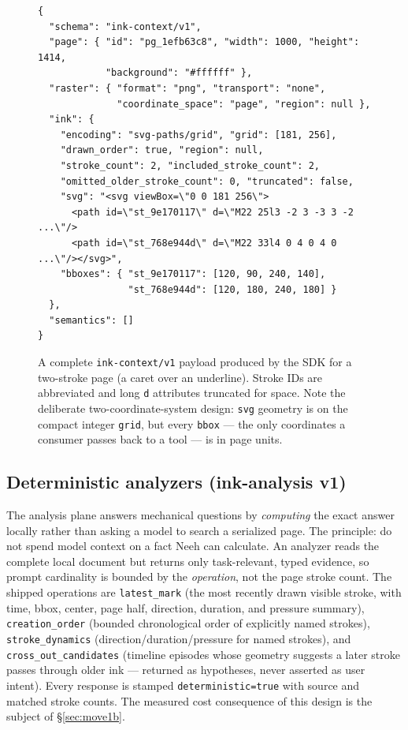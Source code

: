 \documentclass[11pt]{article}
\newcommand{\code}[1]{\texttt{#1}}
\begin{document}
\begin{figure}[t]
\begin{lstlisting}
{
  "schema": "ink-context/v1",
  "page": { "id": "pg_1efb63c8", "width": 1000, "height": 1414,
            "background": "#ffffff" },
  "raster": { "format": "png", "transport": "none",
              "coordinate_space": "page", "region": null },
  "ink": {
    "encoding": "svg-paths/grid", "grid": [181, 256],
    "drawn_order": true, "region": null,
    "stroke_count": 2, "included_stroke_count": 2,
    "omitted_older_stroke_count": 0, "truncated": false,
    "svg": "<svg viewBox=\"0 0 181 256\">
      <path id=\"st_9e170117\" d=\"M22 25l3 -2 3 -3 3 -2 ...\"/>
      <path id=\"st_768e944d\" d=\"M22 33l4 0 4 0 4 0 ...\"/></svg>",
    "bboxes": { "st_9e170117": [120, 90, 240, 140],
                "st_768e944d": [120, 180, 240, 180] }
  },
  "semantics": []
}
\end{lstlisting}
\vspace{-0.4em}
\caption{A complete \code{ink-context/v1} payload produced by the SDK for a
two-stroke page (a caret over an underline). Stroke IDs are abbreviated and long
\code{d} attributes truncated for space. Note the deliberate two-coordinate-system
design: \code{svg} geometry is on the compact integer \code{grid}, but every
\code{bbox} --- the only coordinates a consumer passes back to a tool --- is in
page units.}
\label{fig:icf}
\end{figure}

\subsection{Deterministic analyzers (ink-analysis v1)}
The analysis plane answers mechanical questions by \emph{computing} the exact
answer locally rather than asking a model to search a serialized page. The
principle: do not spend model context on a fact Neeh can calculate. An analyzer
reads the complete local document but returns only task-relevant, typed
evidence, so prompt cardinality is bounded by the \emph{operation}, not the page
stroke count. The shipped operations are \code{latest\_mark} (the most recently
drawn visible stroke, with time, bbox, center, page half, direction, duration,
and pressure summary), \code{creation\_order} (bounded chronological order of
explicitly named strokes), \code{stroke\_dynamics} (direction/duration/pressure
for named strokes), and \code{cross\_out\_candidates} (timeline episodes whose
geometry suggests a later stroke passes through older ink --- returned as
hypotheses, never asserted as user intent). Every response is stamped
\code{deterministic=true} with source and matched stroke counts. The measured
cost consequence of this design is the subject of \S\ref{sec:move1b}.
\end{document}
